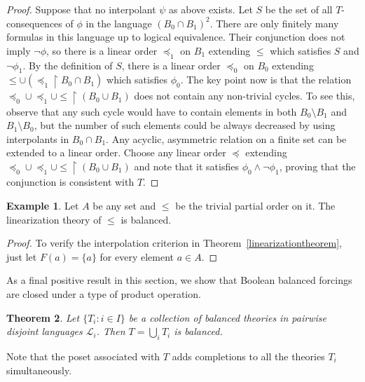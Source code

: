\documentclass{article}
\newtheorem{theorem}{Theorem}[section]
\theoremstyle{definition}
\newtheorem{example}[theorem]{Example}
\begin{document}
\begin{proof}
Suppose that no interpolant $\psi$ as above exists. Let $S$ be the set of all $T$-consequences of $\phi$ in the language $(B_0\cap B_1)^2$. There are only finitely many formulas in this language up to logical equivalence. Their conjunction does not imply $\lnot\phi$, so there is a linear order $\preceq_1$ on $B_1$ extending $\leq$ which satisfies $S$ and $\lnot\phi_1$. By the definition of $S$, there is a linear order $\preceq_0$ on $B_0$ extending $\leq\cup (\preceq_1\restriction B_0\cap B_1)$ which satisfies $\phi_0$. The key point now is that the relation $\preceq_0\cup\preceq_1\cup\leq\restriction (B_0\cup B_1)$ does not contain any non-trivial cycles. To see this, observe that any such cycle would have to contain elements in both $B_0\setminus B_1$ and $B_1\setminus B_0$, but the number of such elements could be always decreased by using interpolants in $B_0\cap B_1$. Any acyclic, asymmetric relation on a finite set can be extended to a linear order. Choose any linear order $\preceq$ extending  $\preceq_0\cup\preceq_1\cup\leq\restriction (B_0\cup B_1)$ and note that it satisfies $\phi_0\land\lnot\phi_1$, proving that the conjunction is consistent with $T$.
\end{proof}

\begin{example}
Let $A$ be any set and $\leq$ be the trivial partial order on it. The linearization theory of $\leq$ is balanced.
\end{example}

\begin{proof}
To verify the interpolation criterion in Theorem~\ref{linearizationtheorem}, just let $F(a)=\{a\}$ for every element $a\in A$.
\end{proof}

\noindent As a final positive result in this section, we show that Boolean balanced forcings are closed under a type of product operation.

\begin{theorem}
	\label{producttheorem}
	Let $\{T_i\colon i\in I\}$ be a collection of balanced theories in pairwise disjoint languages $\mathcal{L}_i$. Then $T=\bigcup_iT_i$ is balanced.
\end{theorem}

\noindent Note that the poset associated with $T$ adds completions to all the theories $T_i$ simultaneously.
\end{document}
